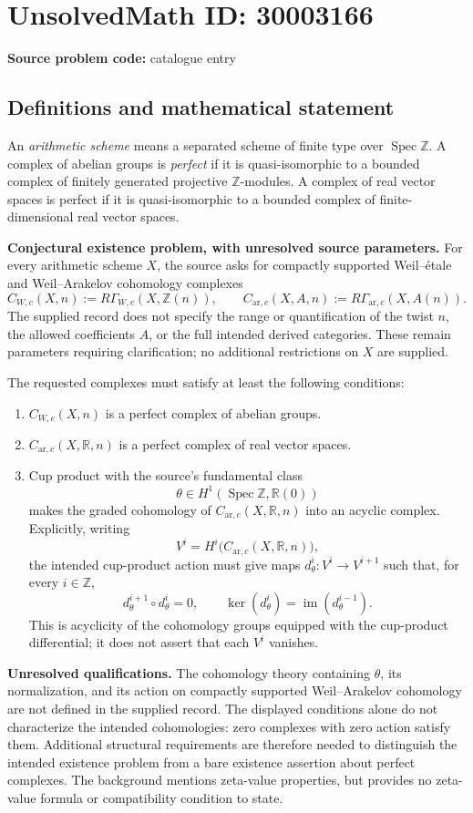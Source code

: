 \documentclass[11pt]{article}
\newcommand{\Z}{\mathbb{Z}}
\newcommand{\R}{\mathbb{R}}
\begin{document}
\section*{UnsolvedMath ID: 30003166}
\textbf{Source problem code:} catalogue entry
\subsection{Definitions and mathematical statement}
An \emph{arithmetic scheme} means a separated scheme of finite type over \(\operatorname{Spec}\Z\). A complex of abelian groups is \emph{perfect} if it is quasi-isomorphic to a bounded complex of finitely generated projective \(\Z\)-modules. A complex of real vector spaces is perfect if it is quasi-isomorphic to a bounded complex of finite-dimensional real vector spaces.

\textbf{Conjectural existence problem, with unresolved source parameters.} For every arithmetic scheme \(X\), the source asks for compactly supported Weil--\'{e}tale and Weil--Arakelov cohomology complexes
\[
C_{W,c}(X,n):=R\Gamma_{W,c}(X,\Z(n)),\qquad
C_{\mathrm{ar},c}(X,A,n):=R\Gamma_{\mathrm{ar},c}(X,A(n)).
\]
The supplied record does not specify the range or quantification of the twist \(n\), the allowed coefficients \(A\), or the full intended derived categories. These remain parameters requiring clarification; no additional restrictions on \(X\) are supplied.

The requested complexes must satisfy at least the following conditions:
\begin{enumerate}
\item \(C_{W,c}(X,n)\) is a perfect complex of abelian groups.
\item \(C_{\mathrm{ar},c}(X,\R,n)\) is a perfect complex of real vector spaces.
\item Cup product with the source's fundamental class
\[
\theta\in H^1(\operatorname{Spec}\Z,\R(0))
\]
makes the graded cohomology of \(C_{\mathrm{ar},c}(X,\R,n)\) into an acyclic complex. Explicitly, writing
\[
V^i=H^i\bigl(C_{\mathrm{ar},c}(X,\R,n)\bigr),
\]
the intended cup-product action must give maps \(d_\theta^i:V^i\to V^{i+1}\) such that, for every \(i\in\Z\),
\[
d_\theta^{i+1}\circ d_\theta^i=0,
\qquad
\ker(d_\theta^i)=\operatorname{im}(d_\theta^{i-1}).
\]
This is acyclicity of the cohomology groups equipped with the cup-product differential; it does not assert that each \(V^i\) vanishes.
\end{enumerate}

\textbf{Unresolved qualifications.} The cohomology theory containing \(\theta\), its normalization, and its action on compactly supported Weil--Arakelov cohomology are not defined in the supplied record. The displayed conditions alone do not characterize the intended cohomologies: zero complexes with zero action satisfy them. Additional structural requirements are therefore needed to distinguish the intended existence problem from a bare existence assertion about perfect complexes. The background mentions zeta-value properties, but provides no zeta-value formula or compatibility condition to state.
\end{document}
